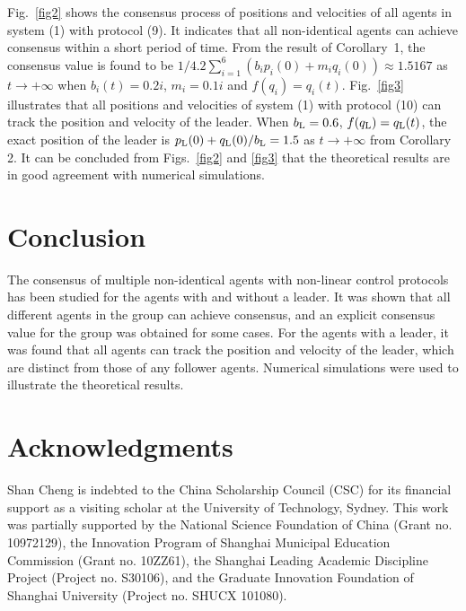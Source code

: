 \documentclass{cta-author}
\begin{document}
Fig.~\ref{fig2} shows the consensus process of positions and velocities of all agents in
system (1) with protocol (9). It indicates that all non-identical agents can achieve consensus
within a short period of time. From the result of
Corollary~1, the consensus value is found to be
${1}/{4.2}\sum_{i=1}^{6}(b_{i}p_{i}(0)+m_{i}q_{i}(0))\approx 1.5167$ as
$t\rightarrow +\infty$ when $b_{i}(t)=0.2i$, $m_{i}=0.1i$ and
$f(q_{i})=q_{i}(t)$. Fig.~\ref{fig3} illustrates that all positions and
velocities of system (1) with protocol (10) can track the position
and velocity of the leader. When $b_{\rm L}=0.6$, $f(q_{\rm L})=q_{\rm L}(t)$,
the exact position of the leader is
$p_{\rm L}(0)+{q_{\rm L}(0)}/{b_{\rm L}}=1.5$ as $t\rightarrow +\infty$ from
Corollary 2. It can be concluded from Figs.~\ref{fig2} and \ref{fig3} that the
theoretical results are in good agreement with numerical simulations.

\section{Conclusion}\label{sec5}

The consensus of multiple non-identical agents with \hbox{non-linear}
control protocols has been studied for the agents with and without a
leader. It was shown that all different agents in the group can
achieve consensus, and an explicit consensus value for the group was
obtained for some cases. For the agents with a leader, it was found
that all agents can track the position and velocity of the leader,
which are distinct from those of any follower agents. Numerical
simulations were used to illustrate the theoretical results.

\section{Acknowledgments}

Shan Cheng is indebted to the China Scholarship Council (CSC)
for its financial support as a visiting scholar at the University of
Technology, Sydney. This work was partially supported by the
National Science Foundation of China (Grant no. 10972129), the
Innovation Program of Shanghai Municipal Education Commission (Grant
no. 10ZZ61), the Shanghai Leading Academic Discipline Project (Project no.
S30106), and the Graduate Innovation Foundation of Shanghai
University (Project no. SHUCX 101080).
\end{document}
